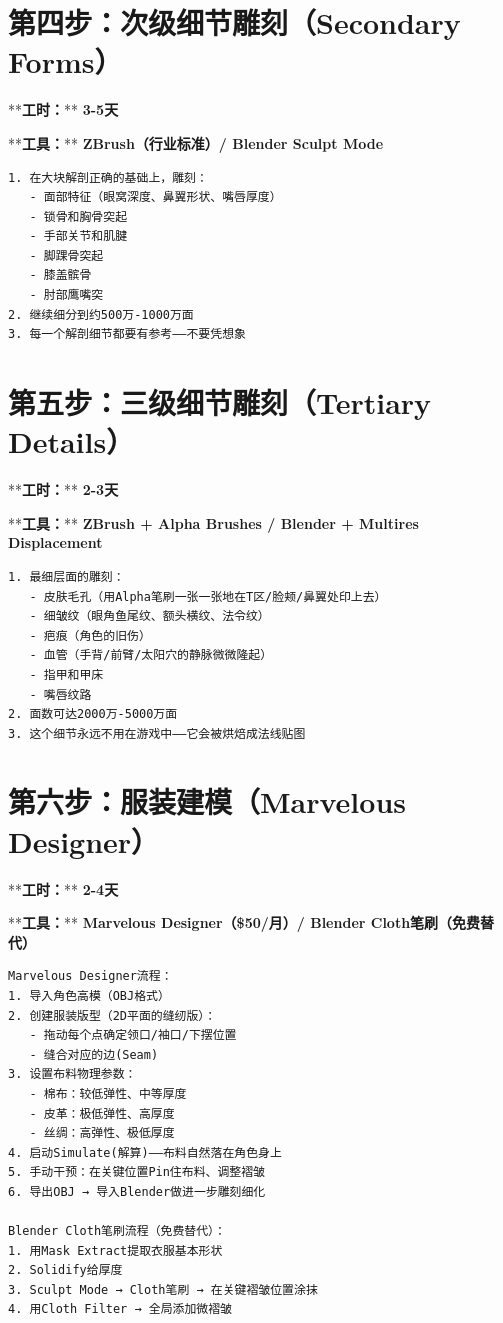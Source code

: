 \documentclass[12pt,a4paper,openany]{ctexbook}
\begin{document}
\section*{第四步：次级细节雕刻（Secondary Forms）}


**\textbf{工时：}**\textbf{ 3-5天}

**\textbf{工具：}**\textbf{ ZBrush（行业标准）/ Blender Sculpt Mode}


\begin{verbatim}
1. 在大块解剖正确的基础上，雕刻：
   - 面部特征（眼窝深度、鼻翼形状、嘴唇厚度）
   - 锁骨和胸骨突起
   - 手部关节和肌腱
   - 脚踝骨突起
   - 膝盖髌骨
   - 肘部鹰嘴突
2. 继续细分到约500万-1000万面
3. 每一个解剖细节都要有参考——不要凭想象
\end{verbatim}


\section*{第五步：三级细节雕刻（Tertiary Details）}


**\textbf{工时：}**\textbf{ 2-3天}

**\textbf{工具：}**\textbf{ ZBrush + Alpha Brushes / Blender + Multires Displacement}


\begin{verbatim}
1. 最细层面的雕刻：
   - 皮肤毛孔（用Alpha笔刷一张一张地在T区/脸颊/鼻翼处印上去）
   - 细皱纹（眼角鱼尾纹、额头横纹、法令纹）
   - 疤痕（角色的旧伤）
   - 血管（手背/前臂/太阳穴的静脉微微隆起）
   - 指甲和甲床
   - 嘴唇纹路
2. 面数可达2000万-5000万面
3. 这个细节永远不用在游戏中——它会被烘焙成法线贴图
\end{verbatim}


\section*{第六步：服装建模（Marvelous Designer）}


**\textbf{工时：}**\textbf{ 2-4天}

**\textbf{工具：}**\textbf{ Marvelous Designer（\$50/月）/ Blender Cloth笔刷（免费替代）}


\begin{verbatim}
Marvelous Designer流程：
1. 导入角色高模（OBJ格式）
2. 创建服装版型（2D平面的缝纫版）：
   - 拖动每个点确定领口/袖口/下摆位置
   - 缝合对应的边(Seam)
3. 设置布料物理参数：
   - 棉布：较低弹性、中等厚度
   - 皮革：极低弹性、高厚度
   - 丝绸：高弹性、极低厚度
4. 启动Simulate(解算)——布料自然落在角色身上
5. 手动干预：在关键位置Pin住布料、调整褶皱
6. 导出OBJ → 导入Blender做进一步雕刻细化

Blender Cloth笔刷流程（免费替代）：
1. 用Mask Extract提取衣服基本形状
2. Solidify给厚度
3. Sculpt Mode → Cloth笔刷 → 在关键褶皱位置涂抹
4. 用Cloth Filter → 全局添加微褶皱
\end{verbatim}
\end{document}
